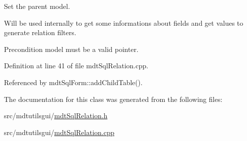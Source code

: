 Set the parent model. 

Will be used internally to get some informations about fields and get values to generate relation filters.

\begin{DoxyPrecond}{Precondition}
model must be a valid pointer. 
\end{DoxyPrecond}


Definition at line 41 of file mdt\-Sql\-Relation.\-cpp.



Referenced by mdt\-Sql\-Form\-::add\-Child\-Table().



The documentation for this class was generated from the following files\-:\begin{DoxyCompactItemize}
\item 
src/mdtutilsgui/\hyperlink{mdt_sql_relation_8h}{mdt\-Sql\-Relation.\-h}\item 
src/mdtutilsgui/\hyperlink{mdt_sql_relation_8cpp}{mdt\-Sql\-Relation.\-cpp}\end{DoxyCompactItemize}
